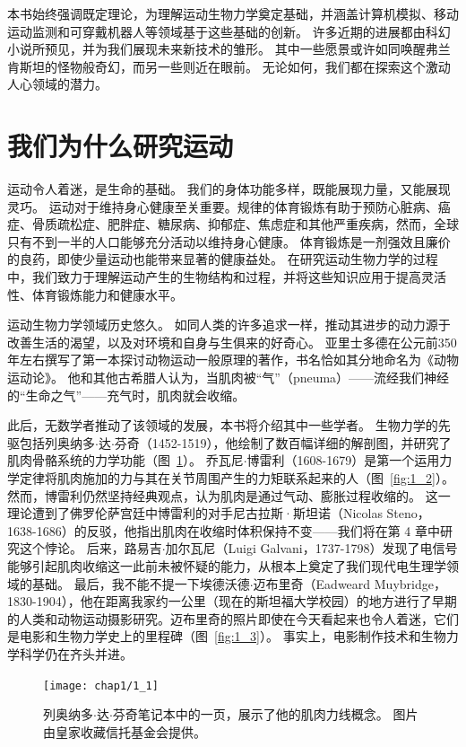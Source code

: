 本书始终强调既定理论，为理解运动生物力学奠定基础，并涵盖计算机模拟、移动运动监测和可穿戴机器人等领域基于这些基础的创新。
许多近期的进展都由科幻小说所预见，并为我们展现未来新技术的雏形。
其中一些愿景或许如同唤醒弗兰肯斯坦的怪物般奇幻，而另一些则近在眼前。
无论如何，我们都在探索这个激动人心领域的潜力。






\section{我们为什么研究运动}

运动令人着迷，是生命的基础。
我们的身体功能多样，既能展现力量，又能展现灵巧。
运动对于维持身心健康至关重要。规律的体育锻炼有助于预防心脏病、癌症、骨质疏松症、肥胖症、糖尿病、抑郁症、焦虑症和其他严重疾病，然而，全球只有不到一半的人口能够充分活动以维持身心健康。
体育锻炼是一剂强效且廉价的良药，即使少量运动也能带来显著的健康益处。
在研究运动生物力学的过程中，我们致力于理解运动产生的生物结构和过程，并将这些知识应用于提高灵活性、体育锻炼能力和健康水平。


运动生物力学领域历史悠久。
如同人类的许多追求一样，推动其进步的动力源于改善生活的渴望，以及对环境和自身与生俱来的好奇心。
亚里士多德在公元前350年左右撰写了第一本探讨动物运动一般原理的著作，书名恰如其分地命名为《动物运动论》。
他和其他古希腊人认为，当肌肉被“气”（pneuma）——流经我们神经的“生命之气”——充气时，肌肉就会收缩。


此后，无数学者推动了该领域的发展，本书将介绍其中一些学者。
生物力学的先驱包括列奥纳多$\cdot$达$\cdot$芬奇（1452-1519），他绘制了数百幅详细的解剖图，并研究了肌肉骨骼系统的力学功能（图~\ref{fig:1_1}）。
乔瓦尼$\cdot$博雷利（1608-1679）是第一个运用力学定律将肌肉施加的力与其在关节周围产生的力矩联系起来的人（图~\ref{fig:1_2}）。
然而，博雷利仍然坚持经典观点，认为肌肉是通过气动、膨胀过程收缩的。
这一理论遭到了佛罗伦萨宫廷中博雷利的对手尼古拉斯·斯坦诺（Nicolas Steno，1638-1686）的反驳，他指出肌肉在收缩时体积保持不变——我们将在第 4 章中研究这个悖论。
后来，路易吉$\cdot$加尔瓦尼（Luigi Galvani，1737-1798）发现了电信号能够引起肌肉收缩这一此前未被怀疑的能力，从根本上奠定了我们现代电生理学领域的基础。
最后，我不能不提一下埃德沃德$\cdot$迈布里奇（Eadweard Muybridge，1830-1904），他在距离我家约一公里（现在的斯坦福大学校园）的地方进行了早期的人类和动物运动摄影研究。迈布里奇的照片即使在今天看起来也令人着迷，它们是电影和生物力学史上的里程碑（图~\ref{fig:1_3}）。
事实上，电影制作技术和生物力学科学仍在齐头并进。


\begin{figure}[!htb]
	\centering
	\texttt{[image: chap1/1\_1]}
	\caption{列奥纳多$\cdot$达$\cdot$芬奇笔记本中的一页，展示了他的肌肉力线概念。
		图片由皇家收藏信托基金会提供。 \label{fig:1_1}}
\end{figure}


